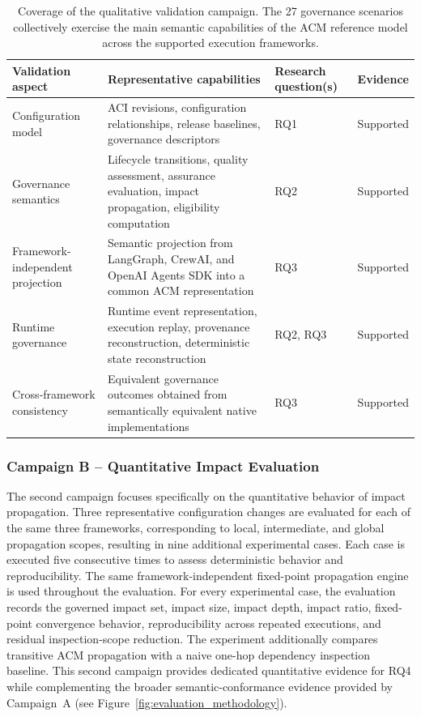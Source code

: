 \documentclass[10pt]{article}
\begin{document}
\begin{table}[t]
	\caption{Coverage of the qualitative validation campaign. The 27 governance scenarios collectively exercise the main semantic capabilities of the ACM reference model across the supported execution frameworks.}
	\label{tab:qualitative_validation}
	\centering
	\footnotesize
	\begin{tabular}{p{3.2cm}p{4.5cm}p{1.8cm}c}
		\toprule
		\textbf{Validation aspect} &
		\textbf{Representative capabilities} &
		\textbf{Research question(s)} &
		\textbf{Evidence} \\
		\midrule
		
		Configuration model
		&
		ACI revisions, configuration relationships, release baselines, governance descriptors
		&
		RQ1
		&
		Supported
		\\
		
		Governance semantics
		&
		Lifecycle transitions, quality assessment, assurance evaluation, impact propagation, eligibility computation
		&
		RQ2
		&
		Supported
		\\
		
		Framework-independent projection
		&
		Semantic projection from LangGraph, CrewAI, and OpenAI Agents SDK into a common ACM representation
		&
		RQ3
		&
		Supported
		\\
		
		Runtime governance
		&
		Runtime event representation, execution replay, provenance reconstruction, deterministic state reconstruction
		&
		RQ2, RQ3
		&
		Supported
		\\
		
		Cross-framework consistency
		&
		Equivalent governance outcomes obtained from semantically equivalent native implementations
		&
		RQ3
		&
		Supported
		\\
		
		\bottomrule
	\end{tabular}
\end{table}

\subsubsection{Campaign B -- Quantitative Impact Evaluation} The second campaign focuses specifically on the quantitative behavior of impact propagation. Three representative configuration changes are evaluated for each of the same three frameworks, corresponding to local, intermediate, and global propagation scopes, resulting in nine additional experimental cases. Each case is executed five consecutive times to assess deterministic behavior and reproducibility. The same framework-independent fixed-point propagation engine is used throughout the evaluation. For every experimental case, the evaluation records the governed impact set, impact size, impact depth, impact ratio, fixed-point convergence behavior, reproducibility across repeated executions, and residual inspection-scope reduction. The experiment additionally compares transitive ACM propagation with a naive one-hop dependency inspection baseline. This second campaign provides dedicated quantitative evidence for RQ4 while complementing the broader semantic-conformance evidence provided by Campaign~A (see Figure~\ref{fig:evaluation_methodology}). 
\end{document}
